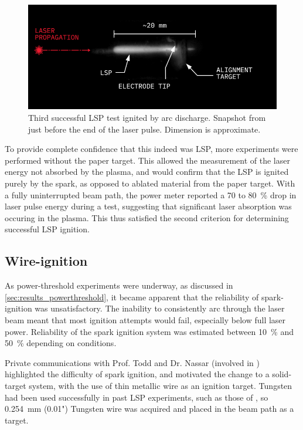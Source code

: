             \begin{figure}[h]
                \centering
                \includegraphics[]{assets/3 design/LSP3_annotated.jpg}
                \caption[Third successful LSP test ignited by arc discharge]{Third successful LSP test ignited by arc discharge. Snapshot from just before the end of the laser pulse. Dimension is approximate.}
                \label{fig:lsp3}
            \end{figure}

            To provide complete confidence that this indeed was LSP, more experiments were performed without the paper target. This allowed the measurement of the laser energy not absorbed by the plasma, and would confirm that the LSP is ignited purely by the spark, as opposed to ablated material from the paper target. With a fully uninterrupted beam path, the power meter reported a 70 to 80~\% drop in laser pulse energy during a test, suggesting that significant laser absorption was occuring in the plasma. This thus satisfied the second criterion for determining successful LSP ignition.

        \subsection{Wire-ignition}
            As power-threshold experiments were underway, as discussed in \autoref{sec:results_powerthreshold}, it became apparent that the reliability of spark-ignition was unsatisfactory. The inability to consistently arc through the laser beam meant that most ignition attempts would fail, especially below full laser power. Reliability of the spark ignition system was estimated between 10~\% and 50~\% depending on conditions.

            Private communications with Prof. Todd and Dr. Nassar (involved in \cite{akarapuNumericalModelLasersustained2009,nassarInvestigationLasersustainedPlasma2012}) highlighted the difficulty of spark ignition, and motivated the change to a solid-target system, with the use of thin metallic wire as an ignition target. Tungsten had been used successfully in past LSP experiments, such as those of \textcite{toyodaThrustPerformanceCW2002}, so \qty{0.254}{mm} (0.01") Tungsten wire was acquired and placed in the beam path as a target.

